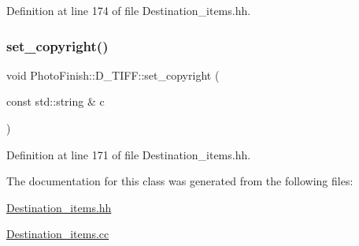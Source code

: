 Definition at line 174 of file Destination\+\_\+items.\+hh.

\mbox{\label{class_photo_finish_1_1_d___t_i_f_f_ab614c8470f34adfcfb41810a323047ec}} 
\subsubsection{\texorpdfstring{set\+\_\+copyright()}{set\_copyright()}}
{\footnotesize\ttfamily void Photo\+Finish\+::\+D\+\_\+\+T\+I\+F\+F\+::set\+\_\+copyright (\begin{DoxyParamCaption}\item[{const std\+::string \&}]{c }\end{DoxyParamCaption})\hspace{0.3cm}{\ttfamily [inline]}}



Definition at line 171 of file Destination\+\_\+items.\+hh.



The documentation for this class was generated from the following files\+:\begin{DoxyCompactItemize}
\item 
\hyperlink{_destination__items_8hh}{Destination\+\_\+items.\+hh}\item 
\hyperlink{_destination__items_8cc}{Destination\+\_\+items.\+cc}\end{DoxyCompactItemize}
